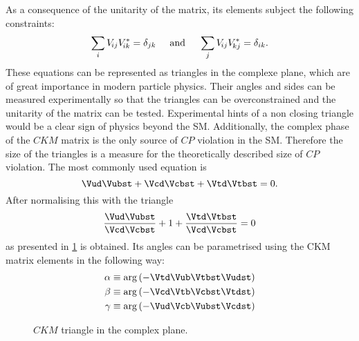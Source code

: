 As a consequence of the unitarity of the matrix, its elements subject the following constraints:
\begin{equation}
\sum_{i} V_{{\kern -0.1em}ij}V_{{\kern -0.1em}ik}^{*} = \delta_{jk}\hspace{0.5cm}\text{and}\hspace{0.5cm}
\sum_{j} V_{{\kern -0.1em}ij}V_{{\kern -0.1em}kj}^{*} = \delta_{ik}.
\end{equation}
These equations can be represented as triangles in the complexe plane, which are of great importance in modern particle physics.
Their angles and sides can be measured experimentally so that the triangles can be overconstrained and the unitarity of the matrix can be tested.
Experimental hints of a non closing triangle would be a clear sign of physics beyond the \ac{SM}.
Additionally, the complex phase of the $CKM$ matrix is the only source of $CP$ violation in the \ac{SM}.
Therefore the size of the triangles is a measure for the theoretically described size of $CP$ violation.
The most commonly used equation is
\begin{equation}
\Vud\Vubst + \Vcd\Vcbst + \Vtd\Vtbst = 0.
\end{equation}
After normalising this with \Vcd\Vcbst the triangle
\begin{equation}
\frac{\Vud\Vubst}{\Vcd\Vcbst} + 1 + \frac{\Vtd\Vtbst}{\Vcd\Vcbst} = 0 \label{eq:CKMtriangle}
\end{equation}
as presented in \cref{fig:ckmtheory} is obtained.
Its angles can be parametrised using the CKM matrix elements in the following way:
\begin{equation}
\begin{aligned}
\alpha&\equiv\arg\left(-\Vtd\Vub\Vtbst\Vudst\right)\\
\beta&\equiv\arg\left(-\Vcd\Vtb\Vcbst\Vtdst\right)\\
\gamma&\equiv\arg\left(-\Vud\Vcb\Vubst\Vcdst\right)
\end{aligned}
\end{equation}
\begin{figure}[tbp]
	\centering
	
	\caption{$CKM$ triangle in the complex plane.}
	\label{fig:ckmtheory}
\end{figure}
